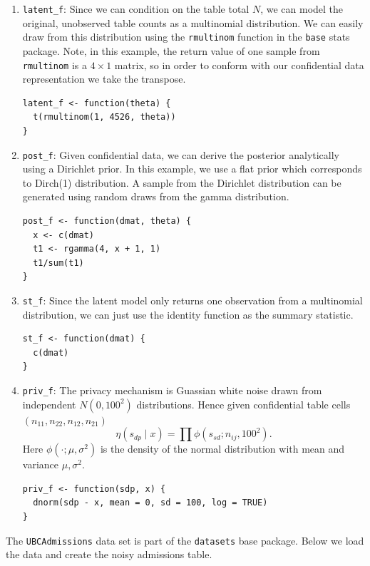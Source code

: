 \begin{enumerate}
\def\labelenumi{\arabic{enumi}.}
\item
  \texttt{latent\_f}: Since we can condition on the table total \(N\), we can model the original, unobserved table counts as a multinomial
  distribution. We can easily draw from this distribution using the
  \texttt{rmultinom} function in the \texttt{base} stats package. Note, in this example,
  the return value of one sample from \texttt{rmultinom} is a \(4 \times 1\) matrix, so
  in order to conform with our confidential data representation we take the transpose.

\begin{verbatim}
latent_f <- function(theta) {
  t(rmultinom(1, 4526, theta))
}
\end{verbatim}
\item
  \texttt{post\_f}: Given confidential data, we can derive the posterior analytically
  using a Dirichlet prior. In this example, we use a flat prior which
  corresponds to Dirch(1) distribution. A sample from the Dirichlet distribution
  can be generated using random draws from the gamma distribution.

\begin{verbatim}
post_f <- function(dmat, theta) {
  x <- c(dmat)
  t1 <- rgamma(4, x + 1, 1)
  t1/sum(t1)
}
\end{verbatim}
\item
  \texttt{st\_f}: Since the latent model only returns one observation from a multinomial
  distribution, we can just use the identity function as the summary statistic.

\begin{verbatim}
st_f <- function(dmat) {
  c(dmat)
}
\end{verbatim}
\item
  \texttt{priv\_f}: The privacy mechanism is Guassian white noise drawn from independent \(N(0,100^2)\) distributions. Hence given
  confidential table cells \((n_{11}, n_{22}, n_{12}, n_{21})\)
  \[
  \eta(s_{dp} \mid x) = \prod \phi(s_{sd}; n_{ij}, 100^2).
  \]
  Here \(\phi(\cdot;\mu,\sigma^2)\) is the density of the normal distribution
  with mean and variance \(\mu,\sigma^2\).

\begin{verbatim}
priv_f <- function(sdp, x) {
  dnorm(sdp - x, mean = 0, sd = 100, log = TRUE)
}
\end{verbatim}
\end{enumerate}

The \texttt{UBCAdmissions} data set is part of the \texttt{datasets} base package.
Below we load the data and create the noisy admissions table.

